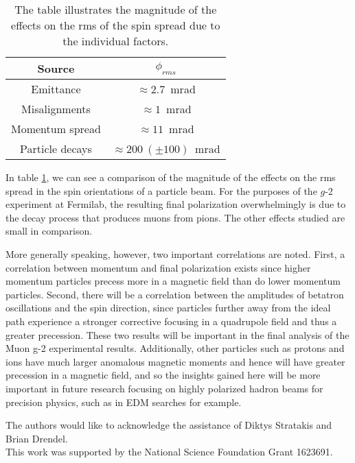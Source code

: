 \documentclass[12pt]{article}
\begin{document}
\begin{table}
\label{tab:Results}
\begin{center}
\begin{tabular}{|c|c|} \hline
Source & $\phi_{rms}$\\ \hline \hline 
Emittance & $\approx 2.7$~mrad\\ \hline 
Misalignments & $\approx 1$~mrad\\ \hline
Momentum spread & $\approx 11$~mrad \\ \hline
Particle decays & $\approx 200~(\pm 100)$~mrad \\
\hline 
\end{tabular}
\caption[Summary of Estimates]{The table illustrates the magnitude of the effects on the rms of the spin spread due to the individual factors.}
\end{center}
\end{table}

In table \ref{tab:Results}, we can see a comparison of the magnitude of the effects on the rms spread in the spin orientations of a particle beam. For the purposes of the $g$-2 experiment at Fermilab,  the resulting final polarization overwhelmingly is due to the decay process that produces muons from pions.  The other effects studied are small in comparison.

More generally speaking, however, two important correlations are noted.  First, a correlation between momentum and final polarization exists since higher momentum particles precess more in a magnetic field than do lower momentum particles.  Second, there will be a correlation between the amplitudes of betatron oscillations and the spin direction, since particles further away from the ideal path experience a stronger corrective focusing in a quadrupole field and thus a greater precession. These two results will be important in the final analysis of the Muon g-2 experimental results.  Additionally, other particles such as protons and ions have much larger anomalous magnetic moments and hence will have greater precession in a magnetic field, and so the insights gained here will be more important in future research focusing on highly polarized hadron beams for precision physics, such as in EDM searches for example.




\bigskip
The authors would like to acknowledge the assistance of Diktys Stratakis and Brian Drendel. \\

This work was supported by the National Science Foundation Grant 1623691.  
\end{document}
